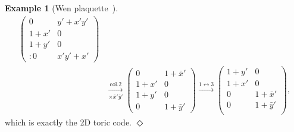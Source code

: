 \documentclass[letterpaper,12pt]{amsart}
\theoremstyle{definition} \newtheorem{defn}{Definition}
\theoremstyle{definition} \newtheorem{rem}{Remark}
\theoremstyle{definition} \newtheorem{example}{Example}
\begin{document}
\begin{example}[Wen plaquette~\cite{Wen2003Plaquette}]
\begin{align*}
%
\begin{pmatrix}
0      & y'+x'y' \\
1+x'   & 0       \\
1+y' & 0       \\:
0      & x'y'+x'
\end{pmatrix}
%
\\
& \xrightarrow[\times \bar x' \bar y']{\text{col.2}}
%
\begin{pmatrix}
0      & 1 + \bar x' \\
1+x'   & 0       \\
1+y' & 0       \\
0      & 1+\bar y'
\end{pmatrix}
%
\xrightarrow{1 \leftrightarrow 3}
%
\begin{pmatrix}
1+y' & 0     \\
1+x'   & 0   \\
0      & 1+ \bar x'\\
0      & 1 + \bar y'\\
\end{pmatrix},
\end{align*}
which is exactly the 2D toric code.
\hfill $\Diamond$
\end{example} %
\end{document}
